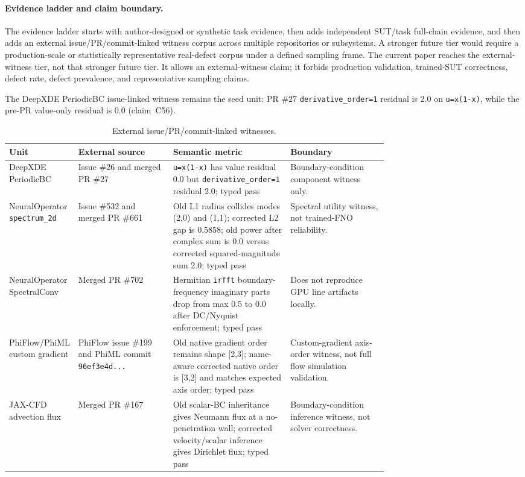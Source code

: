 \documentclass[preprint,12pt]{elsarticle}
\begin{document}
\paragraph{Evidence ladder and claim boundary.}
The evidence ladder starts with author-designed or synthetic task evidence,
then adds independent SUT/task full-chain evidence, and then adds an external
issue/PR/commit-linked witness corpus across multiple repositories or
subsystems. A stronger future tier would require a production-scale or
statistically representative real-defect corpus under a defined sampling frame.
The current paper reaches the external-witness tier, not that stronger future
tier. It allows an external-witness claim; it forbids production validation,
trained-SUT correctness, defect rate, defect prevalence, and representative
sampling claims.

The DeepXDE PeriodicBC issue-linked witness remains the seed unit: PR \#27
\texttt{derivative\_order=1} residual is 2.0 on \texttt{u=x(1-x)}, while the
pre-PR value-only residual is 0.0 (claim~C56).

{\scriptsize
\renewcommand{\arraystretch}{0.92}
\begin{xltabular}{\linewidth}{@{}>{\raggedright\arraybackslash}p{0.17\linewidth}>{\raggedright\arraybackslash}p{0.25\linewidth}>{\raggedright\arraybackslash}p{0.31\linewidth}Y@{}}
\caption{External issue/PR/commit-linked witnesses.}\label{tab:external-defect-corpus}\\
\toprule
\textbf{Unit} & \textbf{External source} & \textbf{Semantic metric} & \textbf{Boundary} \\
\midrule
DeepXDE PeriodicBC & Issue \#26 and merged PR \#27 & \texttt{u=x(1-x)} has value residual 0.0 but \texttt{derivative\_order=1} residual 2.0; typed pass & Boundary-condition component witness only. \\
NeuralOperator \texttt{spectrum\_2d} & Issue \#532 and merged PR \#661 & Old L1 radius collides modes (2,0) and (1,1); corrected L2 gap is 0.5858; old power after complex sum is 0.0 versus corrected squared-magnitude sum 2.0; typed pass & Spectral utility witness, not trained-FNO reliability. \\
NeuralOperator SpectralConv & Merged PR \#702 & Hermitian \texttt{irfft} boundary-frequency imaginary parts drop from max 0.5 to 0.0 after DC/Nyquist enforcement; typed pass & Does not reproduce GPU line artifacts locally. \\
PhiFlow/PhiML custom gradient & PhiFlow issue \#199 and PhiML commit \texttt{96ef3e4d...} & Old native gradient order remains shape [2,3]; name-aware corrected native order is [3,2] and matches expected axis order; typed pass & Custom-gradient axis-order witness, not full flow simulation validation. \\
JAX-CFD advection flux & Merged PR \#167 & Old scalar-BC inheritance gives Neumann flux at a no-penetration wall; corrected velocity/scalar inference gives Dirichlet flux; typed pass & Boundary-condition inference witness, not solver correctness. \\
\bottomrule
\end{xltabular}
}
\end{document}
